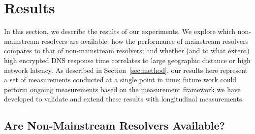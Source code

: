 \section{Results}\label{sec:results} 

In this section, we describe the results of our experiments.  We explore which
non-mainstream resolvers are available; how
the performance of mainstream resolvers compares to that of non-mainstream
resolvers; and whether (and to what extent) high encrypted DNS response time
correlates to large geographic distance or high network latency. As described
in Section~\ref{sec:method}, our results here represent a set of measurements
conducted at a single point in time; future work could perform ongoing
measurements based on the measurement framework we have developed to validate
and extend these results with longitudinal measurements.

\subsection{Are Non-Mainstream Resolvers Available?}

